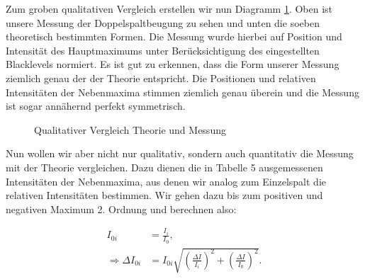 \documentclass{article}
\begin{document}
Zum groben qualitativen Vergleich erstellen wir nun Diagramm \ref{fig:Beug_d_s_vgl}. Oben ist unsere Messung der Doppelspaltbeugung zu sehen und unten die soeben theoretisch bestimmten Formen. Die Messung wurde hierbei auf Position und Intensität des Hauptmaximums unter Berücksichtigung des eingestellten Blacklevels normiert. Es ist gut zu erkennen, dass die Form unserer Messung ziemlich genau der der Theorie entspricht. Die Positionen und relativen Intensitäten der Nebenmaxima stimmen ziemlich genau überein und die Messung ist sogar annähernd perfekt symmetrisch.

\begin{figure}[!t]
    \centering
    \caption{Qualitativer Vergleich Theorie und Messung}
    \label{fig:Beug_d_s_vgl}
\end{figure}

Nun wollen wir aber nicht nur qualitativ, sondern auch quantitativ die Messung mit der Theorie vergleichen. Dazu dienen die in Tabelle 5 ausgemessenen Intensitäten der Nebenmaxima, aus denen wir analog zum Einzelspalt die relativen Intensitäten bestimmen. Wir gehen dazu bis zum positiven und negativen Maximum 2. Ordnung und berechnen also:

\begin{equation}
    \begin{split}
        I_{0i} &= \frac{I_i}{I_0}, \\
        \Rightarrow \Delta I_{0i} &= I_{0i} \sqrt{\left( \frac{\Delta I}{I_i} \right)^2 + \left( \frac{\Delta I}{I_0} \right)^2}.
    \end{split}
\end{equation}
\end{document}

